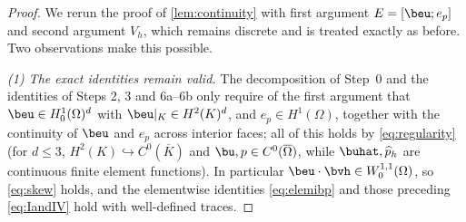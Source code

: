 \begin{proof}
We rerun the proof of \cref{lem:continuity} with first argument $E=[\beu;e_p]$ and second
argument $V_h$, which remains discrete and is treated exactly as before. Two
observations make this possible.

\smallskip\noindent\emph{(1) The exact identities remain valid.}
The decomposition of Step~0 and the identities of Steps 2, 3 and 6a--6b only require of
the first argument that $\beu\in H^1_0(\Omega)^d$ with $\beu|_K\in H^2(K)^d$, and
$e_p\in H^1(\Omega)$, together with the continuity of $\beu$ and $e_p$ across interior
faces; all of this holds by \eqref{eq:regularity} (for $d\le 3$,
$H^2(K)\hookrightarrow C^0(\overline{K})$ and $\bu,p\in C^0(\overline{\Omega})$, while
$\buhat,\widehat{p}_h$ are continuous finite element functions). In particular
$\beu\cdot\bvh\in W^{1,1}_0(\Omega)$, so \eqref{eq:skew} holds, and the elementwise
identities \eqref{eq:elemibp} and those preceding \eqref{eq:IandIV} hold with
well-defined traces.


\end{proof}
